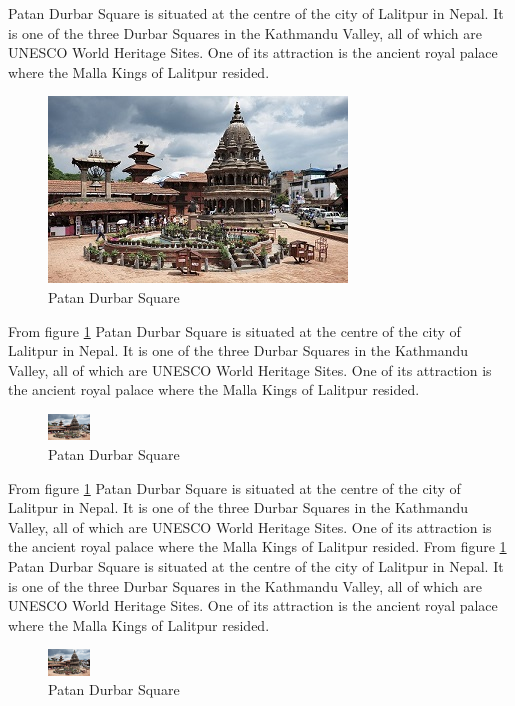 \documentclass[12pt]{report}
\begin{document}
Patan Durbar Square is situated at the centre of the city of Lalitpur in Nepal. It is one of the three Durbar Squares in the Kathmandu Valley, all of which are UNESCO World Heritage Sites. One of its attraction is the ancient royal palace where the Malla Kings of Lalitpur resided.

\begin{figure}[!hbt]
\centering
\includegraphics[scale=0.01,angle=10]{patandurbar.jpg}
\caption{Patan Durbar Square}
\label{fig:figure1}
\end{figure}

From figure \ref{fig:figure1} Patan Durbar Square is situated at the centre of the city of Lalitpur in Nepal. It is one of the three Durbar Squares in the Kathmandu Valley, all of which are UNESCO World Heritage Sites. One of its attraction is the ancient royal palace where the Malla Kings of Lalitpur resided.

\begin{figure} %
    \centering
    \includegraphics[width=0.1\textwidth]{patandurbar.jpg}
    \caption{Patan Durbar Square}
\end{figure}

From figure \ref{fig:figure1} Patan Durbar Square is situated at the centre of the city of Lalitpur in Nepal. It is one of the three Durbar Squares in the Kathmandu Valley, all of which are UNESCO World Heritage Sites. One of its attraction is the ancient royal palace where the Malla Kings of Lalitpur resided.
From figure \ref{fig:figure1} Patan Durbar Square is situated at the centre of the city of Lalitpur in Nepal. It is one of the three Durbar Squares in the Kathmandu Valley, all of which are UNESCO World Heritage Sites. One of its attraction is the ancient royal palace where the Malla Kings of Lalitpur resided.

\begin{figure} %
    \centering
    \includegraphics[width=0.1\textwidth]{patandurbar.jpg}
    \caption{Patan Durbar Square}
\end{figure}
\end{document}
